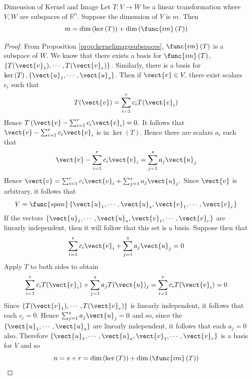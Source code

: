 \begin{theorem}{Dimension of Kernel and Image}\label{thm:dimensionkernelimage}
Let $T:V\rightarrow W$ be a linear transformation where $V,W$ are subspaces of $\mathbb{R}^n$. Suppose the dimension of $V$ is $m$. Then 
\[
m=\dim \left( \ker \left( T\right) \right) +\dim \left( \func{im}\left(
T\right) \right) 
\]
\end{theorem}

\begin{proof}
From Proposition \ref{prop:kernelimagesubspaces}, $\func{im}\left( T\right) $ is a subspace of $W.$ We know that there exists a basis for $\func{im}\left( T\right)$, $\left\{ T(\vect{v}
_{1}),\cdots ,T(\vect{v}_{r})\right\} . $ Similarly, there is a basis for $\ker
\left( T\right) ,\left\{ \vect{u}_{1},\cdots ,\vect{u}_{s}\right\} $. Then if $
\vect{v}\in V,$ there exist scalars $c_{i}$ such that 
\begin{equation*}
T(\vect{v})=\sum_{i=1}^{r}c_{i}T(\vect{v}_{i})
\end{equation*}
Hence $T\left( \vect{v}-\sum_{i=1}^{r}c_{i}\vect{v}_{i}\right) =0.$ It follows
that $\vect{v}-\sum_{i=1}^{r}c_{i}\vect{v}_{i}$ is in $\ker \left( T\right) $.
Hence there are scalars $a_{i}$ such that 
\begin{equation*}
\vect{v}-\sum_{i=1}^{r}c_{i}\vect{v}_{i}=\sum_{j=1}^{s}a_{j}\vect{u}_{j}
\end{equation*}
Hence $\vect{v}=\sum_{i=1}^{r}c_{i}\vect{v}_{i}+\sum_{j=1}^{s}a_{j}\vect{u}
_{j}. $ Since $\vect{v}$ is arbitrary, it follows that 
\begin{equation*}
V=\func{span}\left\{ \vect{u}_{1},\cdots ,\vect{u}_{s},\vect{v}_{1},\cdots ,
\vect{v}_{r}\right\}
\end{equation*}
If the vectors $\left\{ \vect{u}_{1},\cdots ,\vect{u}_{s},\vect{v}_{1},\cdots ,
\vect{v}_{r}\right\} $ are linearly independent, then it will follow that
this set is a basis. Suppose then that 
\begin{equation*}
\sum_{i=1}^{r}c_{i}\vect{v}_{i}+\sum_{j=1}^{s}a_{j}\vect{u}_{j}=0
\end{equation*}
Apply $T$ to both sides to obtain 
\begin{equation*}
\sum_{i=1}^{r}c_{i}T(\vect{v}_{i})+\sum_{j=1}^{s}a_{j}T(\vect{u})
_{j}=\sum_{i=1}^{r}c_{i}T(\vect{v}_{i})=0
\end{equation*}
Since $\left\{ T(\vect{v}_{1}),\cdots ,T(\vect{v}_{r})\right\} $ is linearly
independent, it follows that each $c_{i}=0.$ Hence $\sum_{j=1}^{s}a_{j}\vect{u
}_{j}=0$ and so, since the $\left\{ \vect{u}_{1},\cdots ,\vect{u}_{s}\right\} $
are linearly independent, it follows that each $a_{j}=0$ also. Therefore $\left\{ \vect{u}_{1},\cdots ,\vect{u}_{s},\vect{v}_{1},\cdots ,\vect{v}
_{r}\right\} $ is a basis for $V$ and so 
\begin{equation*}
n=s+r=\dim \left( \ker \left( T\right) \right) +\dim \left( \func{im}\left(
T\right) \right) 
\end{equation*}
\end{proof}

